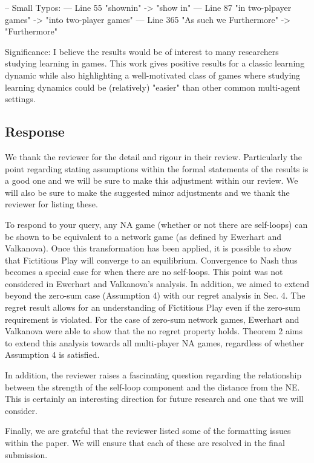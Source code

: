 \documentclass{article}
\begin{document}
	-- Small Typos: --- Line 55 "shownin" -> "show in" --- Line 87 "in two-plpayer games" -> "into two-player games" --- Line 365 "As such we Furthermore" -> "Furthermore"
	
	Significance: I believe the results would be of interest to many researchers studying learning in games. This work gives positive results for a classic learning dynamic while also highlighting a well-motivated class of games where studying learning dynamics could be (relatively) "easier" than other common multi-agent settings.
	
	\subsection{Response}
	
	We thank the reviewer for the detail and rigour in their review. Particularly the point regarding stating assumptions within the formal statements of the results is a good one and we will be sure to make this adjustment within our review. We will also be sure to make the suggested minor adjustments and we thank the reviewer for listing these. 
	
	To respond to your query, any NA game (whether or not there are self-loops) can be shown to be equivalent to a network game (as defined by Ewerhart and Valkanova). Once this transformation has been applied, it is possible to show that Fictitious Play will converge to an equilibrium. Convergence to Nash thus becomes a special case for when there are no self-loops. This point was not considered in Ewerhart and Valkanova's analysis. In addition, we aimed to extend beyond the zero-sum case (Assumption 4) with our regret analysis in Sec. 4. The regret result allows for an understanding of Fictitious Play even if the zero-sum requirement is violated. For the case of zero-sum network games, Ewerhart and Valkanova were able to show that the no regret property holds. Theorem 2 aims to extend this analysis towards all multi-player NA games, regardless of whether Assumption 4 is satisfied.
	
	In addition, the reviewer raises a fascinating question regarding the relationship between the strength of the self-loop component and the distance from the NE. This is certainly an interesting direction for future research and one that we will consider.
	
	Finally, we are grateful that the reviewer listed some of the formatting issues within the paper. We will ensure that each of these are resolved in the final submission.
	
\end{document}
